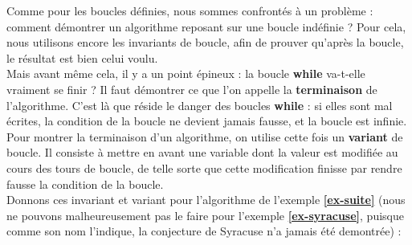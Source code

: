 Comme pour les boucles définies, nous sommes confrontés à un problème : comment démontrer un 
algorithme reposant sur une boucle indéfinie ? Pour cela, nous utilisons encore les invariants de 
boucle, afin de prouver qu'après la boucle, le résultat est bien celui voulu.\\
Mais avant même cela, il y a un point épineux : la boucle \textbf{while} va-t-elle vraiment se 
finir ? Il faut démontrer ce que l'on appelle la \textbf{terminaison} de l'algorithme. C'est là que 
réside le danger des boucles \textbf{while} : si elles sont mal écrites, la condition de la boucle 
ne devient jamais fausse, et la boucle est infinie.\\
Pour montrer la terminaison d'un algorithme, on utilise cette fois un \textbf{variant} de boucle. 
Il consiste à mettre en avant une variable dont la valeur est modifiée au cours des tours de 
boucle, de telle sorte que cette modification finisse par rendre fausse la condition de la boucle.\\
Donnons ces invariant et variant pour l'algorithme de l'exemple \textbf{\ref{ex-suite}} (nous ne 
pouvons malheureusement pas le faire pour l'exemple \textbf{\ref{ex-syracuse}}, puisque comme son 
nom l'indique, la conjecture de Syracuse n'a jamais été demontrée) :\\




